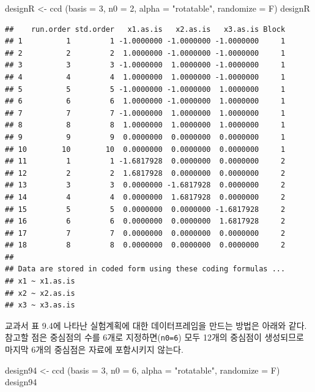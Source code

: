 \documentclass[
]{book}
\newenvironment{Shaded}{\begin{snugshade}}{\end{snugshade}}
\newcommand{\AttributeTok}[1]{\textcolor[rgb]{0.77,0.63,0.00}{#1}}
\newcommand{\DecValTok}[1]{\textcolor[rgb]{0.00,0.00,0.81}{#1}}
\newcommand{\FunctionTok}[1]{\textcolor[rgb]{0.00,0.00,0.00}{#1}}
\newcommand{\NormalTok}[1]{#1}
\newcommand{\OtherTok}[1]{\textcolor[rgb]{0.56,0.35,0.01}{#1}}
\newcommand{\StringTok}[1]{\textcolor[rgb]{0.31,0.60,0.02}{#1}}
\theoremstyle{definition}
\theoremstyle{definition}
\theoremstyle{definition}
\theoremstyle{definition}
\theoremstyle{remark}
\begin{document}
\begin{Shaded}
\begin{Highlighting}[]
\NormalTok{designR }\OtherTok{\textless{}{-}} \FunctionTok{ccd}\NormalTok{ (}\AttributeTok{basis =} \DecValTok{3}\NormalTok{, }\AttributeTok{n0 =} \DecValTok{2}\NormalTok{, }\AttributeTok{alpha =} \StringTok{"rotatable"}\NormalTok{, }\AttributeTok{randomize =}\NormalTok{ F)}
\NormalTok{designR}
\end{Highlighting}
\end{Shaded}

\begin{verbatim}
##    run.order std.order   x1.as.is   x2.as.is   x3.as.is Block
## 1          1         1 -1.0000000 -1.0000000 -1.0000000     1
## 2          2         2  1.0000000 -1.0000000 -1.0000000     1
## 3          3         3 -1.0000000  1.0000000 -1.0000000     1
## 4          4         4  1.0000000  1.0000000 -1.0000000     1
## 5          5         5 -1.0000000 -1.0000000  1.0000000     1
## 6          6         6  1.0000000 -1.0000000  1.0000000     1
## 7          7         7 -1.0000000  1.0000000  1.0000000     1
## 8          8         8  1.0000000  1.0000000  1.0000000     1
## 9          9         9  0.0000000  0.0000000  0.0000000     1
## 10        10        10  0.0000000  0.0000000  0.0000000     1
## 11         1         1 -1.6817928  0.0000000  0.0000000     2
## 12         2         2  1.6817928  0.0000000  0.0000000     2
## 13         3         3  0.0000000 -1.6817928  0.0000000     2
## 14         4         4  0.0000000  1.6817928  0.0000000     2
## 15         5         5  0.0000000  0.0000000 -1.6817928     2
## 16         6         6  0.0000000  0.0000000  1.6817928     2
## 17         7         7  0.0000000  0.0000000  0.0000000     2
## 18         8         8  0.0000000  0.0000000  0.0000000     2
## 
## Data are stored in coded form using these coding formulas ...
## x1 ~ x1.as.is
## x2 ~ x2.as.is
## x3 ~ x3.as.is
\end{verbatim}

교과서 표 9.4에 나타난 실험계획에 대한 데이터프레임을 만드는 방법은 아래와 같다. 참고할 점은 중심점의 수를 6개로 지정하면(\texttt{n0=6}) 모두 12개의 중심점이 생성되므로 마지막 6개의 중심점은 자료에 포함시키지 않는다.

\begin{Shaded}
\begin{Highlighting}[]
\NormalTok{design94 }\OtherTok{\textless{}{-}} \FunctionTok{ccd}\NormalTok{ (}\AttributeTok{basis =} \DecValTok{3}\NormalTok{, }\AttributeTok{n0 =} \DecValTok{6}\NormalTok{, }\AttributeTok{alpha =} \StringTok{"rotatable"}\NormalTok{, }\AttributeTok{randomize =}\NormalTok{ F)}
\NormalTok{design94}
\end{Highlighting}
\end{Shaded}
\end{document}
